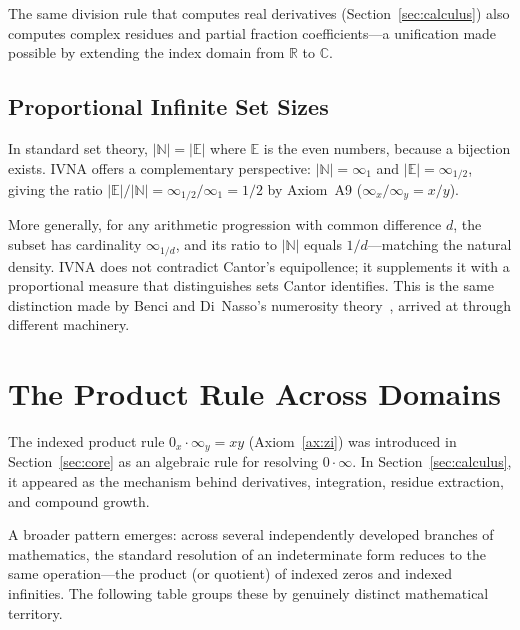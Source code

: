 \documentclass[12pt]{article}
\theoremstyle{definition}
\theoremstyle{remark}
\newcommand{\vz}[1]{0_{#1}}             %
\newcommand{\vi}[1]{\infty_{#1}}        %
\newcommand{\R}{\mathbb{R}}
\newcommand{\C}{\mathbb{C}}
\begin{document}
The same division rule that computes real derivatives
(Section~\ref{sec:calculus}) also computes complex residues and partial
fraction coefficients---a unification made possible by extending the
index domain from $\R$ to $\C$.

\subsection{Proportional Infinite Set Sizes}

In standard set theory, $|\mathbb{N}| = |\mathbb{E}|$ where $\mathbb{E}$
is the even numbers, because a bijection exists. IVNA offers a complementary
perspective: $|\mathbb{N}| = \vi{1}$ and $|\mathbb{E}| = \vi{1/2}$, giving
the ratio $|\mathbb{E}|/|\mathbb{N}| = \vi{1/2}/\vi{1} = 1/2$ by
Axiom~A9 ($\vi{x}/\vi{y} = x/y$).

More generally, for any arithmetic progression with common difference $d$,
the subset has cardinality $\vi{1/d}$, and its ratio to $|\mathbb{N}|$
equals $1/d$---matching the natural density. IVNA does not contradict
Cantor's equipollence; it supplements it with a proportional measure
that distinguishes sets Cantor identifies. This is the same distinction
made by Benci and Di~Nasso's numerosity theory~\cite{benci2003,benci2019},
arrived at through different machinery.


\section{The Product Rule Across Domains}
\label{sec:crossdomain}

The indexed product rule $\vz{x} \cdot \vi{y} = xy$
(Axiom~\ref{ax:zi}) was introduced in Section~\ref{sec:core} as an
algebraic rule for resolving $0 \cdot \infty$. In
Section~\ref{sec:calculus}, it appeared as the mechanism behind
derivatives, integration, residue extraction, and compound growth.

A broader pattern emerges: across several independently developed
branches of mathematics, the standard resolution of an indeterminate
form reduces to the same operation---the product (or quotient) of
indexed zeros and indexed infinities. The following table groups
these by genuinely distinct mathematical territory.
\end{document}
